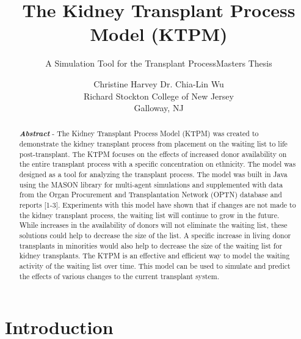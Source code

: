 \documentclass[9pt,a4paper,twocolumn]{scrartcl}
\begin{document}
\title{The Kidney Transplant Process Model (KTPM)}
\subtitle{A Simulation Tool for the Transplant Process}
\subtitle{Masters Thesis}
\author{
    Christine Harvey \qquad Dr. Chia-Lin Wu\\
    Richard Stockton College of New Jersey\\
    Galloway, NJ\\
}
\date{}

\maketitle

\begin{abstract}
\textit {\textbf {Abstract}} - The Kidney Transplant Process Model (KTPM) was created to demonstrate the kidney transplant process from placement on the waiting list to life post-transplant.  The KTPM focuses on the effects of increased donor availability on the entire transplant process with a specific concentration on ethnicity.  The model was designed as a tool for analyzing the transplant process.  The model was built in Java using the MASON library for multi-agent simulations and supplemented with data from the Organ Procurement and Transplantation Network (OPTN) database and reports [1-3].
Experiments with this model have shown that if changes are not made to the kidney transplant process, the waiting list will continue to grow in the future.  While increases in the availability of donors will not eliminate the waiting list, these solutions could help to decrease the size of the list.  A specific increase in living donor transplants in minorities would also help to decrease the size of the waiting list for kidney transplants.
The KTPM is an effective and efficient way to model the waiting activity of the waiting list over time.  This model can be used to simulate and predict the effects of various changes to the current transplant system.
\end{abstract}

\section{Introduction}
\end{document}
